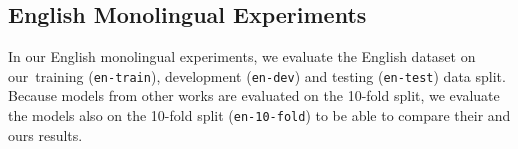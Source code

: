\documentclass[10pt, a4paper]{article}
\begin{document}
\subsection{English Monolingual Experiments}
\label{sec:english-monolingual-experiments}

\par In our English monolingual experiments, we evaluate the English dataset on our~training (\texttt{en-train}), development (\texttt{en-dev}) and testing (\texttt{en-test}) data split.  Because models from other works \cite{zhao2015self-adasent,CNN-MCFA-subj-2018,khodak-etal-2018-la-byte-mLSTM7,reimers-gurevych-2019-sentence,nandi2021empirical-indove-subj} are evaluated on the 10-fold split, we evaluate the models also on the 10-fold split (\texttt{en-10-fold}) to be able to compare their and ours results.
\end{document}
